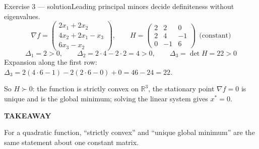 \documentclass[aspectratio=169,11pt]{beamer}
\newcommand{\kicker}[1]{{\color{hseaccent}\scriptsize\bfseries\MakeUppercase{#1}}}
\newcommand{\takeaway}[2]{%
  \par\smallskip\noindent
  \colorbox{hselight}{\parbox{\dimexpr\textwidth-2\fboxsep}{%
    \kicker{#1}\par\vspace{0.12em}\footnotesize #2}}\par}
\begin{document}
\begin{frame}{Exercise 3 --- solution}{Leading principal minors decide definiteness without eigenvalues.}
  \vspace{-0.2em}
  \[ \nabla f=\begin{pmatrix}2x_1+2x_2\\ 4x_2+2x_1-x_3\\ 6x_3-x_2\end{pmatrix},
    \qquad
    H=\begin{pmatrix}2&2&0\\2&4&-1\\0&-1&6\end{pmatrix}\ \ \text{(constant)} \]
  \vspace{-0.3em}
  \[ \Delta_1=2>0,\qquad \Delta_2=2\cdot 4-2\cdot 2=4>0,\qquad \Delta_3=\det H=22>0 \]
  \vspace{-0.5em}
  {\footnotesize Expansion along the first row: $\Delta_3=2(4\cdot 6-1)-2(2\cdot 6-0)+0=46-24=22$.}
  \par\vspace{0.9em}
  {\small So $H\succ 0$: the function is strictly convex on $\mathbb{R}^3$, the stationary point
    $\nabla f=0$ is unique and is the global minimum; solving the linear system gives $x^\ast=0$.}
  \vspace{0.4em}
  \takeaway{takeaway}{For a quadratic function, ``strictly convex'' and ``unique global minimum'' are the same
    statement about one constant matrix.}
\end{frame}
\end{document}
